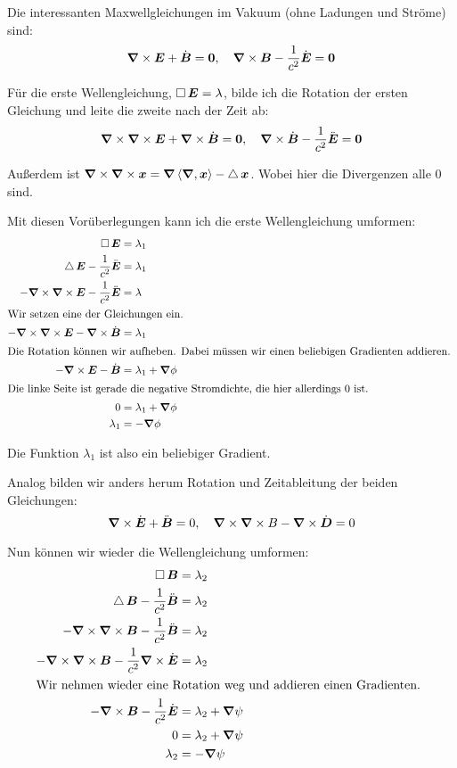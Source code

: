 Die interessanten Maxwellgleichungen im Vakuum (ohne Ladungen und Ströme) sind:
\[
	\boldsymbol{\nabla} \times \boldsymbol{E} + \dot{\boldsymbol{B}} = \boldsymbol{0}
	,\quad
	\boldsymbol{\nabla} \times \boldsymbol{B} - \frac{1}{c^2} \dot{\boldsymbol{E}} = \boldsymbol{0}
\]

Für die erste Wellengleichung, $\mathop{{}\Box}\nolimits \boldsymbol{E} = \lambda$, bilde ich die
Rotation der ersten Gleichung und leite die zweite nach der Zeit ab:
\[
	\boldsymbol{\nabla} \times \boldsymbol{\nabla} \times \boldsymbol{E} + \boldsymbol{\nabla} \times \dot{\boldsymbol{B}} = \boldsymbol{0}
	,\quad
	\boldsymbol{\nabla} \times \dot{\boldsymbol{B}} - \frac{1}{c^2} \ddot{\boldsymbol{E}} = \boldsymbol{0}
\]

Außerdem ist $\boldsymbol{\nabla} \times \boldsymbol{\nabla} \times \boldsymbol{x} = \boldsymbol{\nabla} \left\langle \boldsymbol{\nabla}, \boldsymbol{x} \right\rangle - \mathop{{}\bigtriangleup}\nolimits \boldsymbol{x}$. Wobei hier die Divergenzen alle $0$ sind.

Mit diesen Vorüberlegungen kann ich die erste Wellengleichung umformen:
\begin{align*}
	\dalambert \vec E &= \lambda_1 \\
	\laplace \vec E - \frac{1}{c^2} \ddot{\vec E} &= \lambda_1 \\
	- \curl \curl \vec E - \frac{1}{c^2} \ddot{\vec E} &= \lambda \\
	\intertext{%
		Wir setzen eine der Gleichungen ein.
	}
	- \curl \curl \vec E - \curl \dot{\vec B} &= \lambda_1 \\
	\intertext{%
		Die Rotation können wir aufheben. Dabei müssen wir einen beliebigen
		Gradienten addieren.
	}
	- \curl \vec E - \dot{\vec B} &= \lambda_1 + \vnabla \phi \\
	\intertext{%
		Die linke Seite ist gerade die negative Stromdichte, die hier
		allerdings $0$ ist.
	}
	0 &= \lambda_1 + \vnabla \phi \\
	\lambda_1 &= - \vnabla \phi
\end{align*}

Die Funktion $\lambda_1$ ist also ein beliebiger Gradient.

Analog bilden wir anders herum Rotation und Zeitableitung der beiden
Gleichungen:
\[
	\boldsymbol{\nabla} \times \dot{\boldsymbol{E}} + \ddot{\boldsymbol{B}} = 0
	,\quad
	\boldsymbol{\nabla} \times \boldsymbol{\nabla} \times B - \boldsymbol{\nabla} \times \dot{\boldsymbol{D}} = 0
\]

Nun können wir wieder die Wellengleichung umformen:
\begin{align*}
	\dalambert \vec B &= \lambda_2 \\
	\laplace \vec B - \frac{1}{c^2} \ddot{\vec B} &= \lambda_2 \\
- \curl \curl \vec B - \frac{1}{c^2} \ddot{\vec B} &= \lambda_2 \\
	   - \curl \curl \vec B - \frac{1}{c^2} \curl \dot{\vec E} &= \lambda_2 \\
	\intertext{%
		Wir nehmen wieder eine Rotation weg und addieren einen Gradienten.
	}
	   - \curl \vec B - \frac{1}{c^2} \dot{\vec E} &= \lambda_2 + \vnabla \psi \\
	   0 &= \lambda_2 + \vnabla \psi \\
	   \lambda_2 &= - \vnabla \psi
\end{align*}

